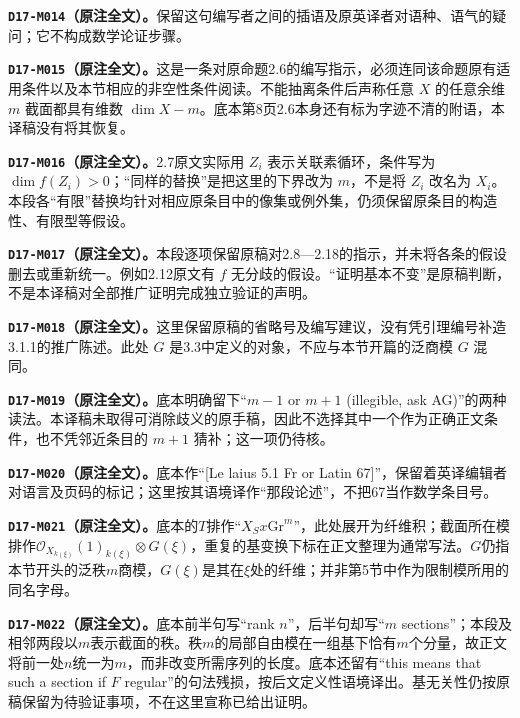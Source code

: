 \par\medskip\noindent\textbf{\texttt{D17-M014}（原注全文）。}保留这句编写者之间的插语及原英译者对语种、语气的疑问；它不构成数学论证步骤。

\par\medskip\noindent\textbf{\texttt{D17-M015}（原注全文）。}这是一条对原命题2.6的编写指示，必须连同该命题原有适用条件以及本节相应的非空性条件阅读。不能抽离条件后声称任意 $X$ 的任意余维 $m$ 截面都具有维数 $\dim X-m$。底本第8页2.6本身还有标为字迹不清的附语，本译稿没有将其恢复。

\par\medskip\noindent\textbf{\texttt{D17-M016}（原注全文）。}2.7原文实际用 $Z_i$ 表示关联素循环，条件写为 $\dim f(Z_i)>0$；“同样的替换”是把这里的下界改为 $m$，不是将 $Z_i$ 改名为 $X_i$。本段各“有限”替换均针对相应原条目中的像集或例外集，仍须保留原条目的构造性、有限型等假设。

\par\medskip\noindent\textbf{\texttt{D17-M017}（原注全文）。}本段逐项保留原稿对2.8—2.18的指示，并未将各条的假设删去或重新统一。例如2.12原文有 $f$ 无分歧的假设。“证明基本不变”是原稿判断，不是本译稿对全部推广证明完成独立验证的声明。

\par\medskip\noindent\textbf{\texttt{D17-M018}（原注全文）。}这里保留原稿的省略号及编写建议，没有凭引理编号补造3.1.1的推广陈述。此处 $G$ 是3.3中定义的对象，不应与本节开篇的泛商模 $G$ 混同。

\par\medskip\noindent\textbf{\texttt{D17-M019}（原注全文）。}底本明确留下“$m-1$ or $m+1$ (illegible, ask AG)”的两种读法。本译稿未取得可消除歧义的原手稿，因此不选择其中一个作为正确正文条件，也不凭邻近条目的 $m+1$ 猜补；这一项仍待核。

\par\medskip\noindent\textbf{\texttt{D17-M020}（原注全文）。}底本作“[Le laius 5.1 Fr or Latin 67]”，保留着英译编辑者对语言及页码的标记；这里按其语境译作“那段论述”，不把67当作数学条目号。

\par\medskip\noindent\textbf{\texttt{D17-M021}（原注全文）。}底本的$T$排作“$X_Sx\mathrm{Gr}^m$”，此处展开为纤维积；截面所在模排作$\mathcal O_{X_{k(\xi)}}(1)_{k(\xi)}\otimes G(\xi)$，重复的基变换下标在正文整理为通常写法。$G$仍指本节开头的泛秩$m$商模，$G(\xi)$是其在$\xi$处的纤维；并非第5节中作为限制模所用的同名字母。

\par\medskip\noindent\textbf{\texttt{D17-M022}（原注全文）。}底本前半句写“rank $n$”，后半句却写“$m$ sections”；本段及相邻两段以$m$表示截面的秩。秩$m$的局部自由模在一组基下恰有$m$个分量，故正文将前一处$n$统一为$m$，而非改变所需序列的长度。底本还留有“this means that such a section if $F$ regular”的句法残损，按后文定义性语境译出。基无关性仍按原稿保留为待验证事项，不在这里宣称已给出证明。

